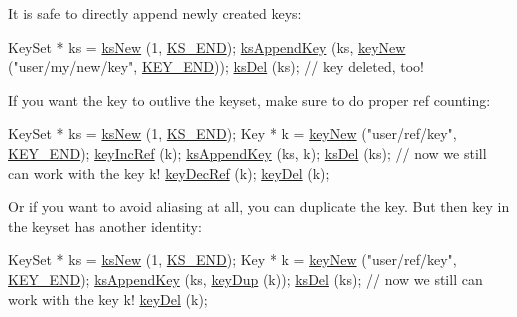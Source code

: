 It is safe to directly append newly created keys\+: 
\begin{DoxyCodeInclude}
KeySet * ks = \hyperlink{group__keyset_ga671e1aaee3ae9dc13b4834a4ddbd2c3c}{ksNew} (1, \hyperlink{group__keyset_ga7a28fce3773b2c873c94ac80b8b4cd54}{KS\_END});
\hyperlink{group__keyset_gaa5a1d467a4d71041edce68ea7748ce45}{ksAppendKey} (ks, \hyperlink{group__key_gad23c65b44bf48d773759e1f9a4d43b89}{keyNew} (\textcolor{stringliteral}{"user/my/new/key"}, \hyperlink{group__key_gga9b703ca49f48b482def322b77d3e6bc8aa8adb6fcb92dec58fb19410eacfdd403}{KEY\_END}));
\hyperlink{group__keyset_ga27e5c16473b02a422238c8d970db7ac8}{ksDel} (ks);
\textcolor{comment}{// key deleted, too!}
\end{DoxyCodeInclude}
 If you want the key to outlive the keyset, make sure to do proper ref counting\+: 
\begin{DoxyCodeInclude}
KeySet * ks = \hyperlink{group__keyset_ga671e1aaee3ae9dc13b4834a4ddbd2c3c}{ksNew} (1, \hyperlink{group__keyset_ga7a28fce3773b2c873c94ac80b8b4cd54}{KS\_END});
Key * k = \hyperlink{group__key_gad23c65b44bf48d773759e1f9a4d43b89}{keyNew} (\textcolor{stringliteral}{"user/ref/key"}, \hyperlink{group__key_gga9b703ca49f48b482def322b77d3e6bc8aa8adb6fcb92dec58fb19410eacfdd403}{KEY\_END});
\hyperlink{group__key_ga6970a6f254d67af7e39f8e469bb162f1}{keyIncRef} (k);
\hyperlink{group__keyset_gaa5a1d467a4d71041edce68ea7748ce45}{ksAppendKey} (ks, k);
\hyperlink{group__keyset_ga27e5c16473b02a422238c8d970db7ac8}{ksDel} (ks);
\textcolor{comment}{// now we still can work with the key k!}
\hyperlink{group__key_ga2c6433ca22109e4e141946057eccb283}{keyDecRef} (k);
\hyperlink{group__key_ga3df95bbc2494e3e6703ece5639be5bb1}{keyDel} (k);
\end{DoxyCodeInclude}
 Or if you want to avoid aliasing at all, you can duplicate the key. But then key in the keyset has another identity\+: 
\begin{DoxyCodeInclude}
KeySet * ks = \hyperlink{group__keyset_ga671e1aaee3ae9dc13b4834a4ddbd2c3c}{ksNew} (1, \hyperlink{group__keyset_ga7a28fce3773b2c873c94ac80b8b4cd54}{KS\_END});
Key * k = \hyperlink{group__key_gad23c65b44bf48d773759e1f9a4d43b89}{keyNew} (\textcolor{stringliteral}{"user/ref/key"}, \hyperlink{group__key_gga9b703ca49f48b482def322b77d3e6bc8aa8adb6fcb92dec58fb19410eacfdd403}{KEY\_END});
\hyperlink{group__keyset_gaa5a1d467a4d71041edce68ea7748ce45}{ksAppendKey} (ks, \hyperlink{group__key_gae6ec6a60cc4b8c1463fa08623d056ce3}{keyDup} (k));
\hyperlink{group__keyset_ga27e5c16473b02a422238c8d970db7ac8}{ksDel} (ks);
\textcolor{comment}{// now we still can work with the key k!}
\hyperlink{group__key_ga3df95bbc2494e3e6703ece5639be5bb1}{keyDel} (k);
\end{DoxyCodeInclude}


